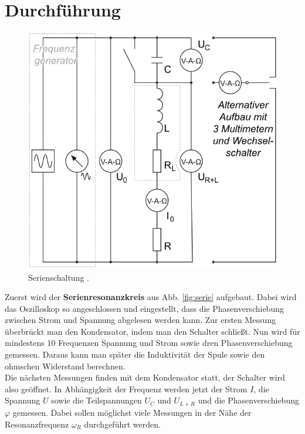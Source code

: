 \documentclass[12pt,a4paper,titlepage,headinclude,bibtotoc]{scrartcl}
\begin{document}
\section{Durchführung}
\label{sec:durchfuehrung}
\begin{figure}[!htb]
	\centering
	\includegraphics[scale=0.8]{serie.png}
	\caption{Serienschaltung \cite[Datum: 03.10.14]{LP14}.}
	\label{fig:serie}
\end{figure}

Zuerst wird der \textbf{Serienresonanzkreis} aus Abb. \eqref{fig:serie} aufgebaut.
Dabei wird das Oszilloskop so angeschlossen und eingestellt, dass die Phasenverschiebung zwischen Strom und Spannung abgelesen werden kann.
Zur ersten Messung überbrückt man den Kondensator, indem man den Schalter schließt.
Nun wird für mindestens 10 Frequenzen Spannung und Strom sowie dren Phasenverschiebung gemessen.
Daraus kann man später die Induktivität der Spule sowie den ohmschen Widerstand berechnen.\\
Die nächsten Messungen finden mit dem Kondensator statt, der Schalter wird also geöffnet.
In Abhängigkeit der Frequenz werden jetzt der Strom $I$, die Spannung $U$ sowie die Teilspannungen $U_C$ und $U_{L+R}$ und die Phasenverschiebung $\varphi$ gemessen.
Dabei sollen möglichst viele Messungen in der Nähe der Resonanzfrequenz $\omega_R$ durchgeführt werden.\\
\end{document}
